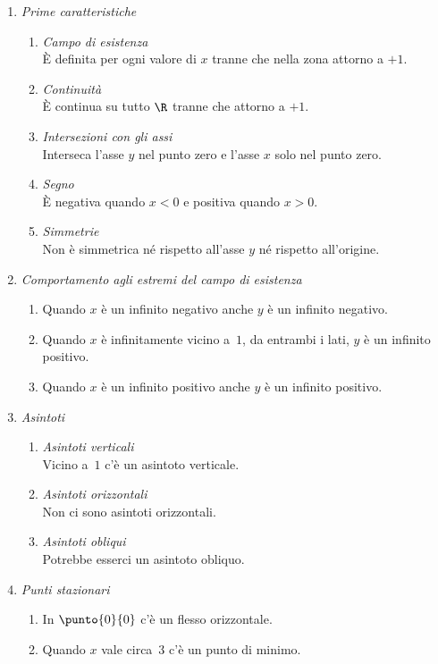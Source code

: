  \begin{enumerate} [nosep]
  \item \emph{Prime caratteristiche}
  \begin{enumerate} [nosep]
  \item \emph{Campo di esistenza}\\
  È definita per ogni valore di \(x\) tranne che nella zona 
attorno a \(+1\).
  \item \emph{Continuità}\\
  È continua su tutto \(\R\) tranne che attorno a \(+1\).
  \item \emph{Intersezioni con gli assi}\\
  Interseca l'asse \(y\) nel punto zero e l'asse \(x\) solo nel 
punto zero.
  \item \emph{Segno}\\
  È negativa quando \(x<0\) e positiva quando \(x>0\).
  \item \emph{Simmetrie}\\
  Non è simmetrica né rispetto all'asse \(y\) né rispetto all'origine.
  \end{enumerate}
  
  \item \emph{Comportamento agli estremi del campo di esistenza}
  \begin{enumerate} [nosep]
   \item Quando \(x\) è un infinito negativo anche \(y\) è un infinito 
negativo.
   \item Quando \(x\) è infinitamente vicino a~\(1\), da entrambi i lati, 
\(y\) è un infinito positivo.
   \item Quando \(x\) è un infinito positivo anche \(y\) è un infinito 
positivo.
  \end{enumerate}
  
  \item \emph{Asintoti}
  \begin{enumerate} [nosep]
  \item \emph{Asintoti verticali}\\
  Vicino a~\(1\) c'è un asintoto verticale.
  \item \emph{Asintoti orizzontali}\\
  Non ci sono asintoti orizzontali.
  \item \emph{Asintoti obliqui}\\
  Potrebbe esserci un asintoto obliquo.
  \end{enumerate}
  
  \item \emph{Punti stazionari}
  \begin{enumerate} [nosep]
  \item In \(\punto{0}{0}\) c'è un flesso orizzontale.
  \item Quando \(x\) vale circa~3 c'è un punto di minimo.
  \end{enumerate}
 

\end{enumerate}

